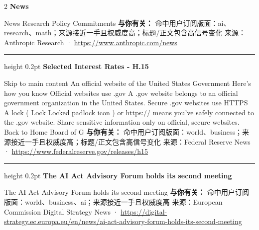 \documentclass[10.5pt]{ctexart}
\begin{document}
\begin{multicols}{2}
{\large\bfseries News}\par
News Research Policy Commitments
\textbf{与你有关：} 命中用户订阅版面：ai、research、math；来源接近一手且权威度高；标题/正文包含高信号变化
{\footnotesize\color{ormuted} 来源：Anthropic Research · \url{https://www.anthropic.com/news}}
\vspace{2mm}
\hrule height 0.2pt
\vspace{2mm}
{\large\bfseries Selected Interest Rates - H.15}\par
Skip to main content An official website of the United States Government Here's how you know Official websites use .gov A .gov website belongs to an official government organization in the United States. Secure .gov websites use HTTPS A lock ( Lock Locked padlock icon ) or https:// means you've safely connected to the .gov website. Share sensitive information only on official, secure websites. Back to Home Board of G
\textbf{与你有关：} 命中用户订阅版面：world、business；来源接近一手且权威度高；标题/正文包含高信号变化
{\footnotesize\color{ormuted} 来源：Federal Reserve News · \url{https://www.federalreserve.gov/releases/h15}}
\vspace{2mm}
\hrule height 0.2pt
\vspace{2mm}
{\large\bfseries The AI Act Advisory Forum holds its second meeting}\par
The AI Act Advisory Forum holds its second meeting
\textbf{与你有关：} 命中用户订阅版面：world、business、ai；来源接近一手且权威度高
{\footnotesize\color{ormuted} 来源：European Commission Digital Strategy News · \url{https://digital-strategy.ec.europa.eu/en/news/ai-act-advisory-forum-holds-its-second-meeting}}
\end{multicols}
\end{document}
